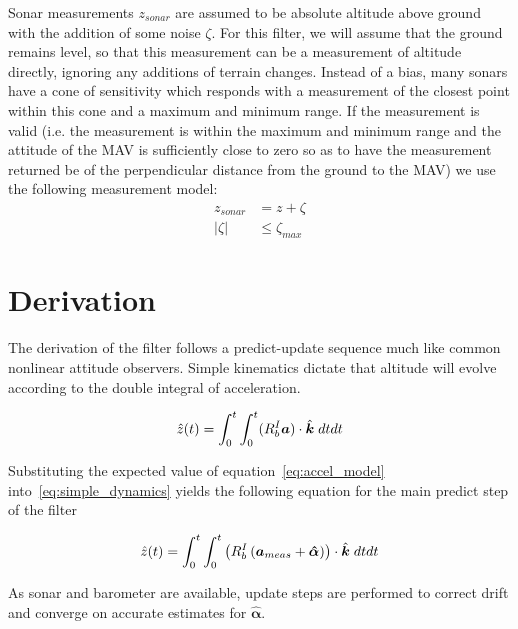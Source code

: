 \documentclass[paper=a4, fontsize=11pt]{scrartcl} %
\numberwithin{equation}{section} %
\numberwithin{figure}{section} %
\numberwithin{table}{section} %
\begin{document}
\newcommand{\zsonar}{z_{sonar}}

Sonar measurements $\zsonar$ are assumed to be absolute altitude above ground with the addition of some noise $\zeta$.  
For this filter, we will assume that the ground remains level, so that this measurement can be a measurement of altitude directly, ignoring any additions of terrain changes.
Instead of a bias, many sonars have a cone of sensitivity which responds with a measurement of the closest point within this cone and a maximum and minimum range.
If the measurement is valid (i.e. the measurement is within the maximum and minimum range and the attitude of the MAV is sufficiently close to zero so as to have the measurement returned be of the perpendicular distance from the ground to the MAV) we use the following measurement model:
\begin{equation}
\begin{aligned}
	\zsonar &= z + \zeta \\
	\vert \zeta \vert &\leq \zeta_{max} 
\end{aligned}
\end{equation}


\section{Derivation}

\newcommand{\alphahat}{\bm{\hat{\alpha}}}

The derivation of the filter follows a predict-update sequence much like common nonlinear attitude observers. 
Simple kinematics dictate that altitude will evolve according to the double integral of acceleration.

\begin{equation}
	\hat{z}(t) = \int_0^t\int_0^t (R_b^I\bm{a}) \cdot \hat{\bm{k}} \; dtdt
	\label{eq:simple_dynamics}
\end{equation}

Substituting the expected value of equation~\ref{eq:accel_model} into~\ref{eq:simple_dynamics} yields the following equation for the main predict step of the filter

\begin{equation}
	\zhat(t) = \int_0^t\int_0^t \left(\RbI \left(\ameas + \alphahat\right) \right) \cdot \khat \; dtdt
\end{equation}

As sonar and barometer are available, update steps are performed to correct drift and converge on accurate estimates for $\alphahat$.








\end{document}
